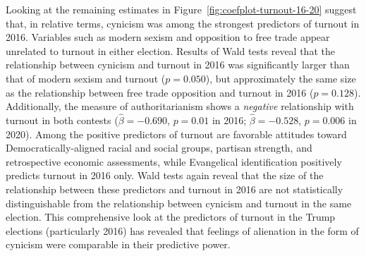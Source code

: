 \documentclass[12pt]{article}
\begin{document}
Looking at the remaining estimates in Figure~\ref{fig:coefplot-turnout-16-20} suggest that, in relative terms, cynicism was among the strongest predictors of turnout in 2016. Variables such as modern sexism and opposition to free trade appear unrelated to turnout in either election. Results of Wald tests reveal that the relationship between cynicism and turnout in 2016 was significantly larger than that of modern sexism and turnout ($p = 0.050$), but approximately the same size as the relationship between free trade opposition and turnout in 2016 ($p=0.128$). Additionally, the measure of authoritarianism shows a \textit{negative} relationship with turnout in both contests ($\hat{\beta} = -0.690$, $p = 0.01$ in 2016; $\hat{\beta} = -0.528$, $p = 0.006$ in 2020). Among the positive predictors of turnout are favorable attitudes toward Democratically-aligned racial and social groups, partisan strength, and retrospective economic assessments, while Evangelical identification positively predicts turnout in 2016 only. Wald tests again reveal that the size of the relationship between these predictors and turnout in 2016 are not statistically distinguishable from the relationship between cynicism and turnout in the same election. This comprehensive look at the predictors of turnout in the Trump elections (particularly 2016) has revealed that feelings of alienation in the form of cynicism were comparable in their predictive power.

\end{document}
